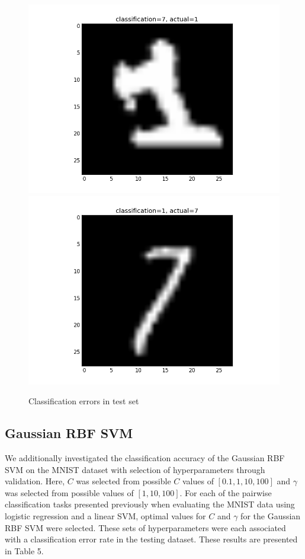 \documentclass{article}
\begin{document}
\begin{figure}[width=\linewidth]
\centering
\begin{multicols}{2}
  \includegraphics[width=1.2\linewidth]{code/P4/error,1.png}
  \includegraphics[width=1.2\linewidth]{code/P4/error,7.png}
\end{multicols}
\caption{Classification errors in test set}
\end{figure}

\subsection{Gaussian RBF SVM}

We additionally investigated the classification accuracy of the Gaussian RBF SVM on the MNIST dataset with selection of hyperparameters through validation. Here, $C$ was selected from possible $C$ values of $[0.1, 1, 10, 100]$ and $\gamma$ was selected from possible values of $[1, 10, 100]$. For each of the pairwise classification tasks presented previously when evaluating the MNIST data using logistic regression and a linear SVM, optimal values for $C$ and $\gamma$ for the Gaussian RBF SVM were selected. These sets of hyperparameters were each associated with a classification error rate in the testing dataset. These results are presented in Table 5.
\end{document}
